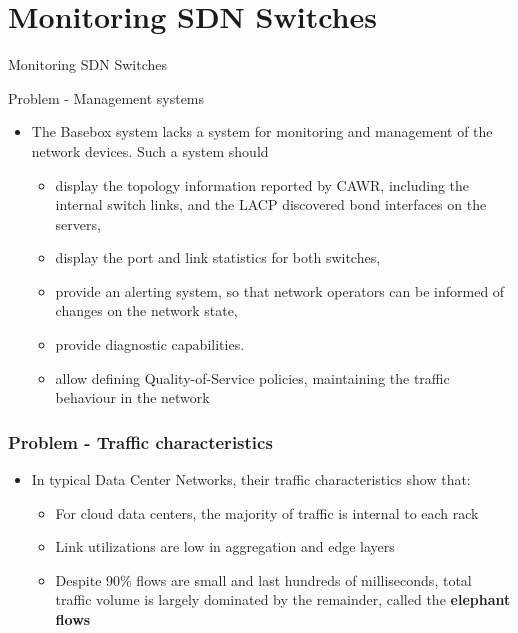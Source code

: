 \documentclass[aspectratio=43]{beamer}
\begin{document}
\section{Monitoring SDN Switches}
\begin{frame}[plain]
    \centering
        \Huge{Monitoring SDN Switches}
\end{frame}

\begin{frame}{Problem - Management systems}
\begin{itemize}
    \item<1->The Basebox system lacks a system for monitoring and management of the network devices. Such a system should 
    \begin{itemize}
        \item<2-> display the topology information reported by CAWR, including the internal switch links, and the LACP discovered bond interfaces on the servers,
        \item<3-> display the port and link statistics for both switches,
        \item<4-> provide an alerting system, so that network operators can be informed of changes on the network state,
        \item<5-> provide diagnostic capabilities.
        \item<6-> allow defining Quality-of-Service policies, maintaining the traffic behaviour in the network
    \end{itemize}
\end{itemize}
\end{frame}

\begin{frame}
\frametitle{Problem - Traffic characteristics}
\begin{itemize}
    \item<1->In typical Data Center Networks, their traffic characteristics show that:
    \begin{itemize}
        \item<2->For cloud data centers, the majority of traffic is internal to each rack
        \item<3->Link utilizations are low in aggregation and edge layers
        \item<4->Despite 90\% flows are small and last hundreds of milliseconds, total traffic volume is largely dominated by the remainder, called the
            \textbf{elephant flows}
    \end{itemize}
\end{itemize}
\end{frame}
\end{document}
